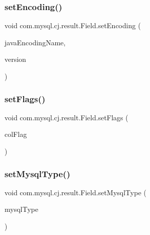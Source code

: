 \subsubsection{\texorpdfstring{set\+Encoding()}{setEncoding()}}
{\footnotesize\ttfamily void com.\+mysql.\+cj.\+result.\+Field.\+set\+Encoding (\begin{DoxyParamCaption}\item[{String}]{java\+Encoding\+Name,  }\item[{\mbox{\hyperlink{classcom_1_1mysql_1_1cj_1_1_server_version}{Server\+Version}}}]{version }\end{DoxyParamCaption})}

\mbox{\label{classcom_1_1mysql_1_1cj_1_1result_1_1_field_a5ff2e6ab274eb68345cc1422d571ff4a}} 
\subsubsection{\texorpdfstring{set\+Flags()}{setFlags()}}
{\footnotesize\ttfamily void com.\+mysql.\+cj.\+result.\+Field.\+set\+Flags (\begin{DoxyParamCaption}\item[{short}]{col\+Flag }\end{DoxyParamCaption})}

\mbox{\label{classcom_1_1mysql_1_1cj_1_1result_1_1_field_a00ee854a2c92e5bf52d2a9c58a099ba6}} 
\subsubsection{\texorpdfstring{set\+Mysql\+Type()}{setMysqlType()}}
{\footnotesize\ttfamily void com.\+mysql.\+cj.\+result.\+Field.\+set\+Mysql\+Type (\begin{DoxyParamCaption}\item[{\mbox{\hyperlink{enumcom_1_1mysql_1_1cj_1_1_mysql_type}{Mysql\+Type}}}]{mysql\+Type }\end{DoxyParamCaption})}

